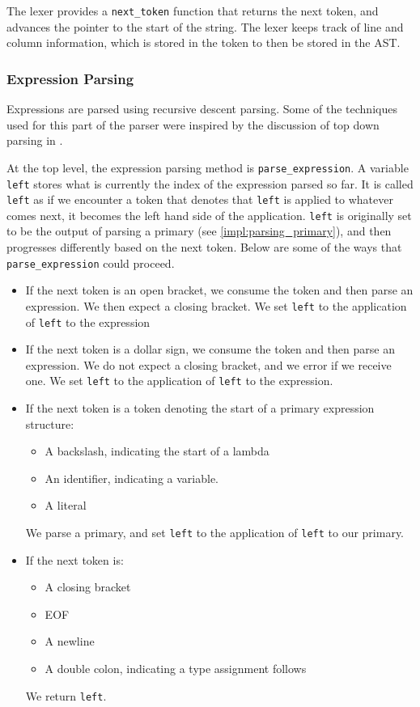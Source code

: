 The lexer provides a \verb|next_token| function that returns the next token, and advances the pointer to the start of the string. The lexer keeps track of line and column information, which is stored in the token to then be stored in the AST. 

\subsubsection{Expression Parsing}
Expressions are parsed using recursive descent parsing. Some of the techniques used for this part of the parser were inspired by the discussion of top down parsing in \cite{dragon_book}. 

At the top level, the expression parsing method is \verb|parse_expression|. A variable \verb|left| stores what is currently the index of the expression parsed so far. It is called \verb|left| as if we encounter a token that denotes that \verb|left| is applied to whatever comes next, it becomes the left hand side of the application. \verb|left| is originally set to be the output of parsing a primary (see \ref{impl:parsing_primary}), and then progresses differently based on the next token.  Below are some of the ways that \verb|parse_expression| could proceed.
\begin{itemize}
    \item If the next token is an open bracket, we consume the token and then parse an expression. We then expect a closing bracket. We set \verb|left| to the application of \verb|left| to the expression
    \item If the next token is a dollar sign, we consume the token and then parse an expression. We do not expect a closing bracket, and we error if we receive one. We set \verb|left| to the application of \verb|left| to the expression.    
    \item If the next token is a token denoting the start of a primary expression structure:
    \begin{itemize}
        \item A backslash, indicating the start of a lambda
        \item An identifier, indicating a variable.
        \item A literal
    \end{itemize}
    We parse a primary, and set \verb|left| to the application of \verb|left| to our primary.
    \item If the next token is:
    \begin{itemize}
        \item A closing bracket
        \item EOF
        \item A newline
        \item A double colon, indicating a type assignment follows
    \end{itemize}
    We return \verb|left|. 
\end{itemize}

